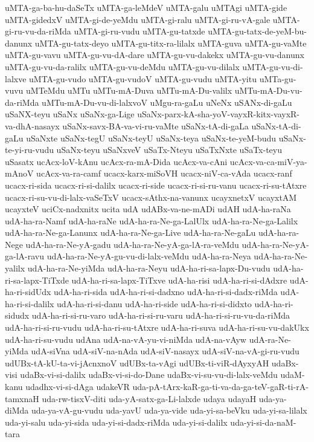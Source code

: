 {uMTA-ga-ba-hu-daSeTx
uMTA-ga-leMdeV
uMTA-galu
uMTAgi
uMTA-gide
uMTA-gidedxV
uMTA-gi-de-yeMdu
uMTA-gi-ralu
uMTA-gi-ru-vA-gale
uMTA-gi-ru-vu-da-riMda
uMTA-gi-ru-vudu
uMTA-gu-tatxde
uMTA-gu-tatx-de-yeM-bu-danunx
uMTA-gu-tatx-deyo
uMTA-gu-titx-ra-lilalx
uMTA-guva
uMTA-gu-vaMte
uMTA-gu-vavu
uMTA-gu-vu-dA-dare
uMTA-gu-vu-dakekx
uMTA-gu-vu-danunx
uMTA-gu-vu-da-ralilx
uMTA-gu-vu-deMdu
uMTA-gu-vu-dilalx
uMTA-gu-vu-di-lalxve
uMTA-gu-vudo
uMTA-gu-vudoV
uMTA-gu-vudu
uMTA-yitu
uMTa-gu-vuvu
uMTeMdu
uMTu
uMTu-mA-Duva
uMTu-mA-Du-valilx
uMTu-mA-Du-vu-da-riMda
uMTu-mA-Du-vu-di-lalxvoV
uMgu-ra-gaLu
uNeNx
uSANx-di-gaLu
uSaNX-teyu
uSaNx
uSaNx-ga-Lige
uSaNx-parx-kA-sha-yoV-vayxR-kitx-vayxR-va-dhA-nasayx
uSaNx-savx-BA-va-vi-ru-vaMte
uSaNx-tA-di-gaLa
uSaNx-tA-di-gaLu
uSaNxte
uSaNx-tegU
uSaNx-teyU
uSaNx-teya
uSaNx-te-yeM-budu
uSaNx-te-yi-ru-vudu
uSaNx-teyu
uSaNxveV
uSaTx-Nteyu
uSaTxNxte
uSaTx-teyu
uSasatx
ucAcx-loV-kAnu
ucAcx-ra-mA-Dida
ucAcx-va-cAni
ucAcx-va-ca-miV-ya-mAnoV
ucAcx-va-ra-camf
ucacx-karx-miSoVH
ucacx-niV-ca-vAda
ucacx-ranf
ucacx-ri-sida
ucacx-ri-si-dalilx
ucacx-ri-side
ucacx-ri-si-ru-vanu
ucacx-ri-su-tAtxre
ucacx-ri-su-vu-di-lalx-vaSeTxV
ucacx-sAthx-na-vanunx
ucayxnetxV
ucayxtAM
ucayxteV
uciCx-nadxnitx
ucita
udA
udABx-va-ne-mADi
udAH
udA-ha-raNa
udA-ha-ra-Namf
udA-ha-raNe
udA-ha-ra-Ne-ga-LalUlx
udA-ha-ra-Ne-ga-Lalilx
udA-ha-ra-Ne-ga-Lanunx
udA-ha-ra-Ne-ga-Live
udA-ha-ra-Ne-gaLu
udA-ha-ra-Nege
udA-ha-ra-Ne-yA-gadu
udA-ha-ra-Ne-yA-ga-lA-ra-veMdu
udA-ha-ra-Ne-yA-ga-lA-ravu
udA-ha-ra-Ne-yA-gu-vu-di-lalx-veMdu
udA-ha-ra-Neya
udA-ha-ra-Ne-yalilx
udA-ha-ra-Ne-yiMda
udA-ha-ra-Neyu
udA-ha-ri-sa-lapx-Du-vudu
udA-ha-ri-sa-lapx-TiTxde
udA-ha-ri-sa-lapx-TiTxve
udA-ha-risi
udA-ha-ri-si-dAdxre
udA-ha-ri-sidUdx
udA-ha-ri-sida
udA-ha-ri-si-dadxno
udA-ha-ri-si-dadx-riMda
udA-ha-ri-si-dalilx
udA-ha-ri-si-danu
udA-ha-ri-side
udA-ha-ri-si-didxto
udA-ha-ri-sidudx
udA-ha-ri-si-ru-varo
udA-ha-ri-si-ru-varu
udA-ha-ri-si-ru-vu-da-riMda
udA-ha-ri-si-ru-vudu
udA-ha-ri-su-tAtxre
udA-ha-ri-suva
udA-ha-ri-su-vu-dakUkx
udA-ha-ri-su-vudu
udAna
udA-na-vA-yu-vi-niMda
udA-na-vAyw
udA-ra-Ne-yiMda
udA-siVna
udA-siV-na-nAda
udA-siV-nasayx
udA-siV-na-vA-gi-ru-vudu
udUBx-tA-kU-ta-vi-jAcnxnoV
udUBx-ta-vAgi
udUBx-ti-viR-dAyxyAH
udaBx-visi
udaBx-vi-si-dalilx
udaBx-vi-si-do-Dane
udaBx-vi-su-vu-di-lalx-veMdu
udaM-kanu
udadhx-vi-si-dAga
udakeVR
uda-pA-tArx-kaR-ga-ti-va-da-ga-teV-gaR-ti-rA-tamxnaH
uda-rw-tisxV-diti
uda-yA-satx-ga-Li-lalxde
udaya
udayaH
uda-ya-diMda
uda-ya-vA-gu-vudu
uda-yavU
uda-ya-vide
uda-yi-sa-beVku
uda-yi-sa-lilalx
uda-yi-salu
uda-yi-sida
uda-yi-si-dadx-riMda
uda-yi-si-dalilx
uda-yi-si-da-naM-tara
}
